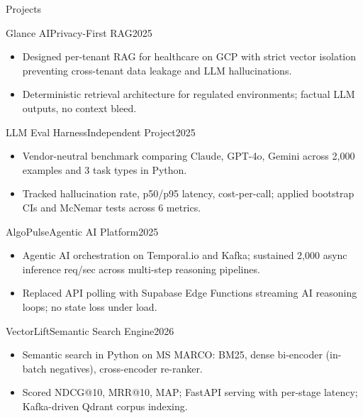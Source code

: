 \documentclass[]{mcdowellcv}
\begin{document}
\begin{cvsection}{Projects}
  \begin{cvsubsection}{Glance AI}{Privacy-First RAG}{2025}
    \begin{itemize}
      \item Designed per-tenant RAG for healthcare on GCP with strict vector isolation preventing cross-tenant data leakage and LLM hallucinations.
      \item Deterministic retrieval architecture for regulated environments; factual LLM outputs, no context bleed.
    \end{itemize}
    \vspace{-1.5pt}
  \end{cvsubsection}

  \begin{cvsubsection}{LLM Eval Harness}{Independent Project}{2025}
    \begin{itemize}
      \item Vendor-neutral benchmark comparing Claude, GPT-4o, Gemini across 2,000 examples and 3 task types in Python.
      \item Tracked hallucination rate, p50/p95 latency, cost-per-call; applied bootstrap CIs and McNemar tests across 6 metrics.
    \end{itemize}
    \vspace{-1.5pt}
  \end{cvsubsection}

  \begin{cvsubsection}{AlgoPulse}{Agentic AI Platform}{2025}
    \begin{itemize}
      \item Agentic AI orchestration on Temporal.io and Kafka; sustained 2,000 async inference req/sec across multi-step reasoning pipelines.
      \item Replaced API polling with Supabase Edge Functions streaming AI reasoning loops; no state loss under load.
    \end{itemize}
    \vspace{-1.5pt}
  \end{cvsubsection}

  \begin{cvsubsection}{VectorLift}{Semantic Search Engine}{2026}
    \begin{itemize}
      \item Semantic search in Python on MS MARCO: BM25, dense bi-encoder (in-batch negatives), cross-encoder re-ranker.
      \item Scored NDCG@10, MRR@10, MAP; FastAPI serving with per-stage latency; Kafka-driven Qdrant corpus indexing.
    \end{itemize}
  \end{cvsubsection}
\end{cvsection}
\end{document}
